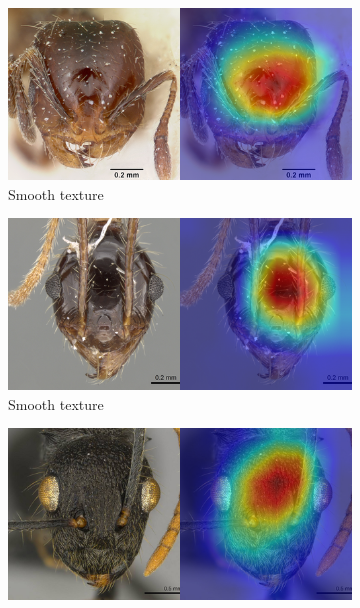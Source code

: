 \documentclass{aci}
\numberwithin{equation}{section}
\begin{document}
\begin{figure}
    \centering
    \begin{subfigure}{\subwidth}
        \includegraphics[width=1\linewidth]{thesis_assets/gradcam/correct_ideal/518.png}
        \caption*{Smooth texture}
        \label{fig:correct_ideal_518}
    \end{subfigure}
    \begin{subfigure}{\subwidth}
        \includegraphics[width=1\linewidth]{thesis_assets/gradcam/correct_ideal/808.png}
        \caption*{Smooth texture}
        \label{fig:correct_ideal_808}
    \end{subfigure}
    \begin{subfigure}{\subwidth}
        \includegraphics[width=1\linewidth]{thesis_assets/gradcam/correct_ideal/842.png}

\end{subfigure}
\end{figure}
\end{document}

